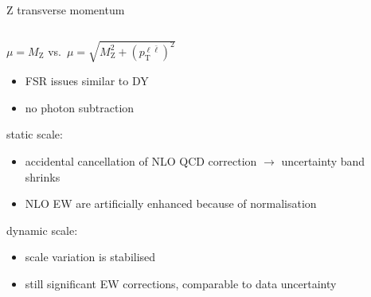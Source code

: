 \begin{frame}[t]{Z transverse momentum}
\begin{columns}[T,onlytextwidth]
\begin{column}{.5\textwidth}
\begin{center}
\alert<1>{$\mu = M_\mathrm{Z}$} vs.\ \alert<2>{$\mu = \sqrt{M_\mathrm{Z}^2 + (p_\mathrm{T}^{\ell \bar{\ell}})^2}$}
\end{center}
\begin{itemize}
\item FSR issues similar to DY
\item no photon subtraction
\end{itemize}
static scale:
\begin{itemize}
\item accidental cancellation of NLO QCD correction $\rightarrow$ uncertainty band shrinks
\item NLO EW are artificially enhanced because of normalisation
\end{itemize}
dynamic scale:
\begin{itemize}
\item scale variation is stabilised
\item still significant EW corrections, comparable to data uncertainty
\end{itemize}
\end{column}
\begin{column}{.5\textwidth}

\end{column}
\end{columns}
\end{frame}
